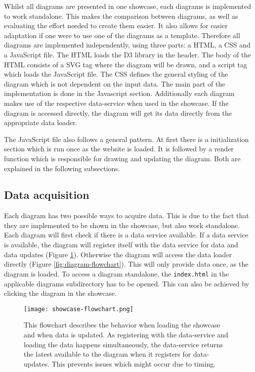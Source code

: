 Whilst all diagrams are presented in one showcase, each diagrams is implemented to work standalone. This makes the comparison between diagrams, as well as evaluating the effort needed to create them easier. It also allows for easier adaptation if one were to use one of the diagrams as a template. Therefore all diagrams are implemented independently, using three parts: a HTML, a CSS and a JavaScript file. The HTML loads the D3 library in the header. The body of the HTML consists of a SVG tag where the diagram will be drawn, and a script tag which loads the JavaScript file. The CSS defines the general styling of the diagram which is not dependent on the input data. The main part of the implementation is done in the Javascript section. Additionally each diagram makes use of the respective data-service when used in the showcase. If the diagram is accessed directly, the diagram will get its data directly from the appropriate data loader.

The JavaScript file also follows a general pattern. At first there is a initialization section which is run once as the website is loaded. It is followed by a render function which is responsible for drawing and updating the diagram. Both are explained in the following subsections.

\subsection{Data acquisition} \label{sec:data-acquisition}
Each diagram has two possible ways to acquire data. This is due to the fact that they are implemented to be shown in the showcase, but also work standalone. Each diagram will first check if there is a data service available. If a data service is available, the diagram will register itself with the data service for data and data updates (Figure \ref{fig:showcase-flowchart}). Otherwise the diagram will access the data loader directly (Figure \ref{fig:diagram-flowchart}). This will only provide data once, as the diagram is loaded. To access a diagram standalone, the \texttt{index.html} in the applicable diagrams subdirectory has to be opened. This can also be achieved by clicking the diagram in the showcase.

\begin{figure}
    \texttt{[image: showcase-flowchart.png]}
    \captionsetup{width=0.9\textwidth}
    \caption[showcase-flowchart]{This flowchart describes the behavior when loading the showcase and when data is updated. As registering with the data-service and loading the data happens simultaneously, the data-service returns the latest available to the diagram when it registers for data-updates. This prevents issues which might occur due to timing.}
    \label{fig:showcase-flowchart}
\end{figure}


